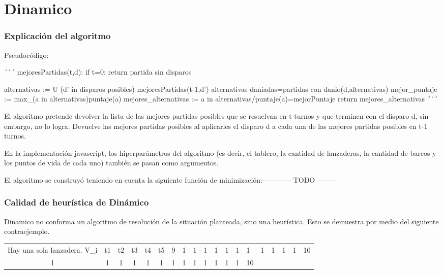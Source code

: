 \part{Dinamico}
\section{Explicación del algoritmo}

Pseudocódigo:

´´´
mejoresPartidas(t,d):
    if t=0:
        return partida sin disparos

    alternativas := U (d' in disparos posibles) mejoresPartidas(t-1,d')
    alternativas daniadas=partidas con danio(d,alternativas)
    mejor_puntaje := max_(a in alternativas){puntaje(a)}
    mejores_alternativas := {a in alternativas/puntaje(a)=mejorPuntaje}
    return mejores_alternativas
´´´

El algoritmo pretende devolver la lista de las mejores partidas posibles que se resuelvan en t turnos y que terminen con el disparo d, sin embargo, no lo logra. Devuelve las mejores partidas posibles al aplicarles el disparo d a cada una de las mejores partidas posibles en t-1 turnos.

En la implementación javascript, los hiperparámetros del algoritmo (es decir, el tablero, la cantidad de lanzaderas, la cantidad de barcos y los puntos de vida de cada uno) también se pasan como argumentos.

El algoritmo se construyó teniendo en cuenta la siguiente función de minimización:------------ TODO --------

\section{Calidad de heurística de Dinámico}

Dinamico no conforma un algoritmo de resolución de la situación planteada, sino una heurística. Esto se demuestra por medio del siguiente contraejemplo.

\begin{center}
\begin{tabular}{ c | c c c c c}
Hay una sola lanzadera.
\hline
V_i & t1 & t2 & t3 & t4 & t5
    &  9 &  1 &  1 &  1 &  1 &  1 & 1 &  1 &  1 &  1 &  1 & 1  & 10 \\
1     &  1 &  1 &  1 &  1 &  1 &  1 & 1 &  1 &  1 &  1 &  1 & 1  & 10
\end{tabular}
\end{center}

